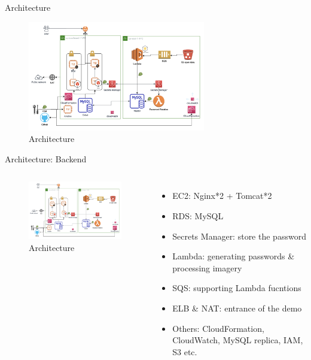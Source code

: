 \documentclass[aspectratio=169]{beamer}
\begin{document}
\begin{frame}[fragile]{Architecture}
  
  \begin{figure}[htbp]
    \centerline{\includegraphics[width=220pt]{images/arch.png}}
    \caption{Architecture}
    \label{fig2}
  \end{figure}

\end{frame}

\begin{frame}[fragile]{Architecture: Backend}

  \begin{columns}
      \begin{figure}[htbp]
        \centerline{\includegraphics[width=220pt]{images/arch.png}}
        \caption{Architecture}
        \label{arch}
      \end{figure}
      \begin{itemize}
        \item EC2: Nginx*2 + Tomcat*2
        \pause
        \item RDS: MySQL
        \pause
        \item Secrets Manager: store the password
        \pause
        \item Lambda: generating passwords \& processing imagery
        \pause
        \item SQS: supporting Lambda fucntions
        \pause
        \item ELB \& NAT: entrance of the demo
        \pause
        \item Others: CloudFormation, CloudWatch, MySQL replica, IAM, S3 etc.
      \end{itemize}
  \end{columns}

\end{frame}
\end{document}
